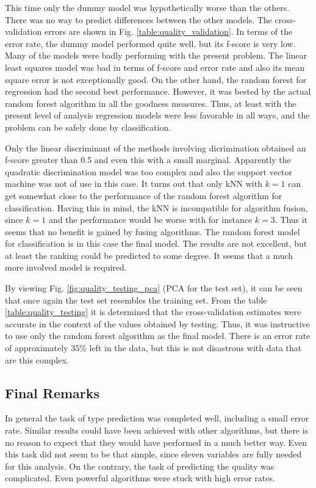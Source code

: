 \documentclass[twoside]{article}
\begin{document}
\begin{multicols}{2}
This time only the dummy model was hypothetically worse than the others. There was no way to predict differences between the other models. The 
cross-validation errors are shown in Fig. \ref{table:quality_validation}. In terms of the error rate, the dummy model performed quite well, but its 
f-score is very low. Many of the models were badly performing with the present problem. The linear least squares model was bad 
in terms of f-score and error rate and also its mean square error is not exceptionally good. On the other hand, the random forest for regression
had the second best performance. However, it was bested by the actual random forest algorithm in all the goodness measures. Thus, at least with
the present level of analysis regression models were less favorable in all ways, and the problem can be safely done by classification.

Only the linear discriminant of the methods involving dicrimination obtained an f-score greater than 0.5 and even this with a small marginal.
Apparently the quadratic discrimination model was too complex and also the support vector machine was not of use in this case. It turns out 
that only kNN with $k = 1$ can get somewhat close to the performance of the random forest algorithm for classification. Having this in mind,
the kNN is incompatible for algorithm fusion, since $k = 1$ and the performance would be worse with for instance $k = 3$. Thus it seems that
no benefit is gained by fusing algorithms. The random forest model for classification is in this case the final model. The results are not
excellent, but at least the ranking could be predicted to some degree. It seems that a much more involved model is required.

By viewing Fig. \ref{fig:quality_testing_pca} (PCA for the test set), it can be seen that once again the test set resembles the training set.
From the table \ref{table:quality_testing} it is determined that the cross-validation estimates were accurate in the context of the values
obtained by testing. Thus, it was instructive to use only the random forest algorithm as the final model. There is an error rate of approximately
$35 \%$ left in the data, but this is not disastrous with data that are this complex.

\subsection{Final Remarks}

In general the task of type prediction was completed well, including a small error rate. Similar results could have been
achieved with other algorithms, but there is no reason to expect that they would have performed in a much better way. Even this task did not seem 
to be that simple, since eleven variables are fully needed for this analysis. On the contrary, the task of predicting the quality was
complicated. Even powerful algorithms were stuck with high error rates.


\end{multicols}
\end{document}

